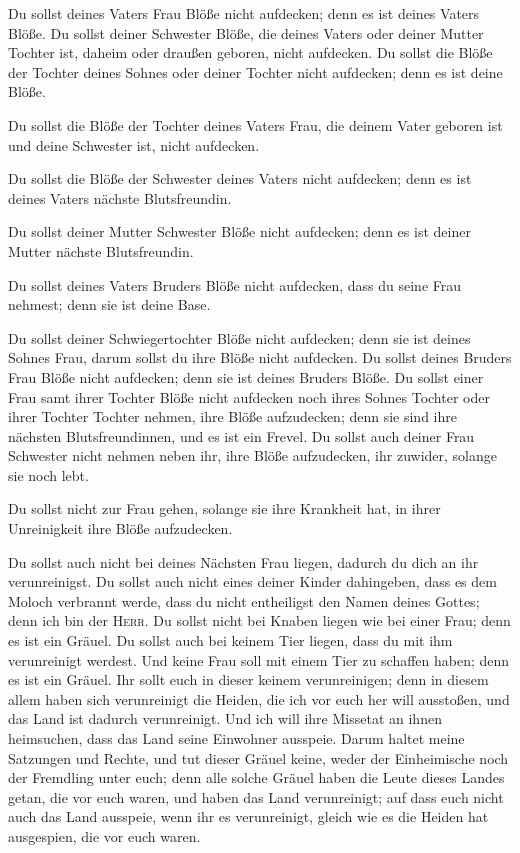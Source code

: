  Du sollst deines Vaters Frau Blöße nicht aufdecken; denn
es ist deines Vaters Blöße.  Du sollst deiner Schwester
Blöße, die deines Vaters oder deiner Mutter Tochter ist, daheim oder
draußen geboren, nicht aufdecken.  Du sollst die Blöße
der Tochter deines Sohnes oder deiner Tochter nicht aufdecken; denn es
ist deine Blöße.

 Du sollst die Blöße der Tochter deines Vaters Frau, die
deinem Vater geboren ist und deine Schwester ist, nicht aufdecken.

 Du sollst die Blöße der Schwester deines Vaters nicht
aufdecken; denn es ist deines Vaters nächste Blutsfreundin.

 Du sollst deiner Mutter Schwester Blöße nicht aufdecken;
denn es ist deiner Mutter nächste Blutsfreundin.

 Du sollst deines Vaters Bruders Blöße nicht aufdecken,
dass du seine Frau nehmest; denn sie ist deine Base.

 Du sollst deiner Schwiegertochter Blöße nicht aufdecken;
denn sie ist deines Sohnes Frau, darum sollst du ihre Blöße nicht
aufdecken.  Du sollst deines Bruders Frau Blöße nicht
aufdecken; denn sie ist deines Bruders Blöße.  Du sollst
einer Frau samt ihrer Tochter Blöße nicht aufdecken noch ihres Sohnes
Tochter oder ihrer Tochter Tochter nehmen, ihre Blöße aufzudecken; denn
sie sind ihre nächsten Blutsfreundinnen, und es ist ein Frevel.
 Du sollst auch deiner Frau Schwester nicht nehmen neben
ihr, ihre Blöße aufzudecken, ihr zuwider, solange sie noch lebt.

 Du sollst nicht zur Frau gehen, solange sie ihre
Krankheit hat, in ihrer Unreinigkeit ihre Blöße aufzudecken.

 Du sollst auch nicht bei deines Nächsten Frau liegen,
dadurch du dich an ihr verunreinigst.  Du sollst auch
nicht eines deiner Kinder dahingeben, dass es dem Moloch verbrannt
werde, dass du nicht entheiligst den Namen deines Gottes; denn ich bin
der \textsc{Herr}.  Du sollst nicht bei Knaben liegen wie
bei einer Frau; denn es ist ein Gräuel.  Du sollst auch
bei keinem Tier liegen, dass du mit ihm verunreinigt werdest. Und keine
Frau soll mit einem Tier zu schaffen haben; denn es ist ein Gräuel.
 Ihr sollt euch in dieser keinem verunreinigen; denn in
diesem allem haben sich verunreinigt die Heiden, die ich vor euch her
will ausstoßen,  und das Land ist dadurch verunreinigt.
Und ich will ihre Missetat an ihnen heimsuchen, dass das Land seine
Einwohner ausspeie.  Darum haltet meine Satzungen und
Rechte, und tut dieser Gräuel keine, weder der Einheimische noch der
Fremdling unter euch;  denn alle solche Gräuel haben die
Leute dieses Landes getan, die vor euch waren, und haben das Land
verunreinigt;  auf dass euch nicht auch das Land
ausspeie, wenn ihr es verunreinigt, gleich wie es die Heiden hat
ausgespien, die vor euch waren.

